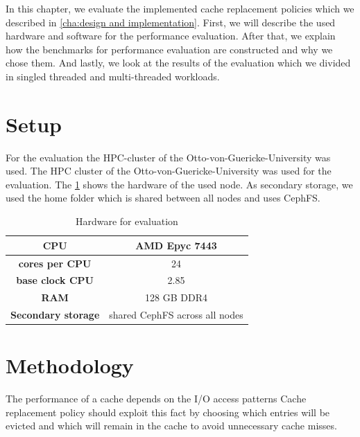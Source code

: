 \documentclass[
	12pt,
	a4paper,
	abstract,
	bibliography=totoc,
	chapterprefix,
	headings=openright,
	numbers=endperiod,
	parskip=half,
	twoside,
]{scrreprt}
\begin{document}

In this chapter, we evaluate the implemented cache replacement policies which we described in \cref{cha:design and implementation}.
First, we will describe the used hardware and software for the performance evaluation.
After that, we explain how the benchmarks for performance evaluation are constructed and why we chose them.
And lastly, we look at the results of the evaluation which we divided in singled threaded and multi-threaded workloads.

\section{Setup}



For the evaluation the HPC-cluster of the Otto-von-Guericke-University was used.
The HPC cluster of the Otto-von-Guericke-University was used for the evaluation.
The \cref{tab:hardware node} shows the hardware of the used node.
As secondary storage, we used the home folder which is shared between all nodes and uses CephFS.

\begin{table}[ht]
	\centering
	\begin{tabular}{|c|c|}
		\hline
		\textbf{CPU} & AMD Epyc 7443\\
		\hline
		\textbf{cores per CPU} & 24\\
		\hline
		\textbf{base clock CPU} & 2.85\\
		\hline
		\textbf{RAM} & 128 GB DDR4\\
		\hline
		\textbf{Secondary storage} & shared CephFS across all nodes \\
		\hline
	\end{tabular}
	\caption{Hardware for evaluation}
	\label{tab:hardware node}
\end{table}


\section{Methodology}

The performance of a cache depends on the I/O access patterns 
Cache replacement policy should exploit this fact by 
choosing which entries will be evicted and which will remain in the cache
 to avoid unnecessary cache misses.
\end{document}
